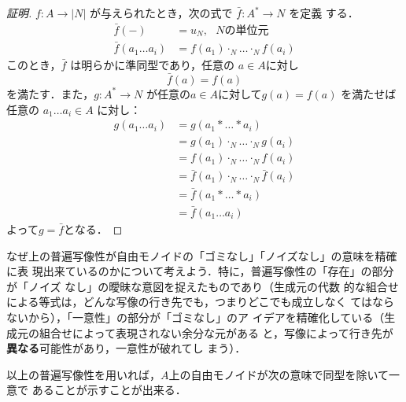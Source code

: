 \begin{proof}[証明]
 $f:A \to |N|$ が与えられたとき，次の式で $\bar f: A^\ast \to N$ を定義
 する．
 \begin{align*}
  \bar f(-) &= u_N,\ \ \ \text{$N$の単位元}\\
  \bar f(a_1 \ldots a_i) &= f(a_1) \cdot_N \ldots \cdot_N f(a_i)
 \end{align*}
 このとき，$\bar f$ は明らかに準同型であり，任意の $a\in A$に対し
 \[
  \bar f(a) = f(a)
 \]
 を満たす．また，$g: A^\ast \to N$ が任意の$a\in A$に対して$g(a) = f(a)$
 を満たせば任意の $a_1\ldots a_i \in A$ に対し：
 \begin{align*}
  g(a_1 \ldots a_i) &= g(a_1 * \ldots * a_i)\\
                    &= g(a_1) \cdot_N \ldots \cdot_N g(a_i)\\
                    &= f(a_1) \cdot_N \ldots \cdot_N f(a_i)\\
                    &= \bar f(a_1) \cdot_N \ldots \cdot_N \bar f(a_i)\\
                    &= \bar f(a_1 * \ldots * a_i)\\
                    &= \bar f(a_1 \dots a_i)
 \end{align*}
 よって$g = \bar f$となる．
\end{proof}
なぜ上の普遍写像性が自由モノイドの「ゴミなし」「ノイズなし」の意味を精確に表
現出来ているのかについて考えよう．特に，普遍写像性の「存在」の部分が「ノイズ
なし」の曖昧な意図を捉えたものであり（生成元の代数
的な組合せによる等式は，どんな写像の行き先でも，つまりどこでも成立しなく
てはならないから），「一意性」の部分が「ゴミなし」のア
イデアを精確化している（生成元の組合せによって表現されない余分な元がある
と，写像によって行き先が{\bfseries 異なる}可能性があり，一意性が破れてし
まう）．

以上の普遍写像性を用いれば，$A$上の自由モノイドが次の意味で同型を除いて一意で
あることが示すことが出来る．

